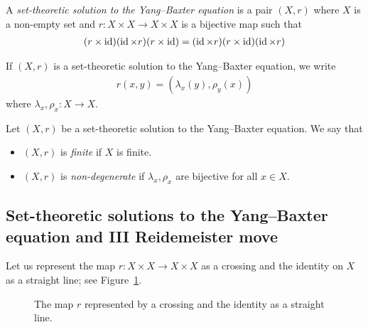     \begin{definition}
        A \emph{set-theoretic solution to the Yang--Baxter equation} is a pair $(X,r)$ where $X$ is a non-empty set and $r: X\times X \to X \times X$ is a bijective map such that
        \begin{align}\label{eq:YBE}
            (r\times \operatorname{id})(\operatorname{id} \times r)(r\times \operatorname{id}) = (\operatorname{id} \times r)(r\times \operatorname{id})(\operatorname{id} \times r)
        \end{align}
    \end{definition}
    
    \begin{convention}
        If $(X,r)$ is a set-theoretic solution to the Yang--Baxter equation, we write 
        \begin{align*}
            r(x,y) = (\lambda_x(y),\rho_y(x))        
        \end{align*}
        where $\lambda_x,\rho_x:X\to X$.
    \end{convention}


    \begin{definition}
        Let $(X,r)$ be a set-theoretic solution to the  Yang--Baxter equation. We say that 
        \begin{itemize}
            \item $(X,r)$ is \emph{finite} if $X$ is finite.
            \item $(X,r)$ is \emph{non-degenerate} if $\lambda_x,\rho_x$ are bijective for all $x\in X$.
        \end{itemize}
    \end{definition}

\subsection{Set-theoretic solutions to the Yang--Baxter equation and III Reidemeister move}
    Let us represent the map $r:X \times X \to X \times X$ as a crossing and the identity on $X$ as a straight line; see Figure~\ref{fig:crossing}. 
    \begin{figure}[h!]
        \centering
        \caption{The map $r$ represented by a crossing and the identity as a straight line.}
        \label{fig:crossing}
    \end{figure}

